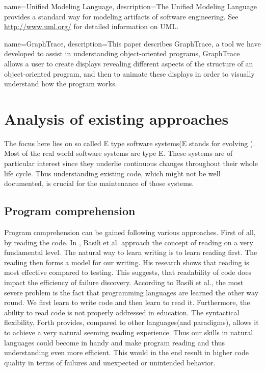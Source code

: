 {
  name={Unified Modeling Language},
  description={The Unified Modeling Language provides a standard way for modeling artifacts of software engineering. See \url{http://www.uml.org/} for detailed information on UML.}
}

{
  name={GraphTrace},
  description={This paper describes GraphTrace, a tool we have developed to assist in understanding object-oriented programs, GraphTrace allows a user to create displays revealing different aspects of the structure of an object-oriented program, and then to animate these displays in order to visually understand how the program works.}
}

\chapter{Analysis of existing approaches}
\label{chap:StateOfTheArt}

The focus here lies on so called E type software systems(E stands for evolving \cite{Cook:2006:ESS:1115566.1115567}). Most of the real world software systems are type E. These systems are of particular interest since they underlie continuous changes throughout their whole life cycle. Thus understanding existing code, which might not be well documented, is crucial for the maintenance of those systems.

\section{Program comprehension}

Program comprehension can be gained following various approaches. First of all, by reading the code.
In \cite{Basili:1997:EPR:257260.257262}, Basili et al. approach the concept of reading on a very fundamental level. The natural way to learn writing is to learn reading first. The reading then forms a model for our writing.  His research shows that reading is most effective compared to testing. This suggests, that readability of code does impact the efficiency of failure discovery. According to Basili et al., the most severe problem is the fact that programming languages are learned the other way round. We first learn to write code and then learn to read it. Furthermore, the ability to read code is not properly addressed in education. The syntactical flexibility, Forth provides, compared to other languages(and paradigms), allows it to achieve a very natural seeming reading experience. Thus our skills in natural languages could become in handy and make program reading and thus understanding even more efficient. This would in the end result in higher code quality in terms of failures and unexpected or unintended behavior.

